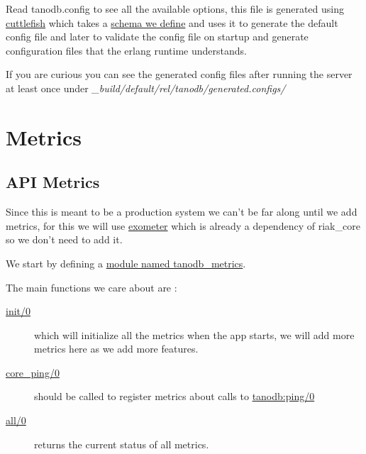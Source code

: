 \documentclass[letterpaper,10pt,english]{sphinxmanual}
\begin{document}
Read tanodb.config to see all the available options, this file is generated
using \href{https://github.com/basho/cuttlefish}{cuttlefish} which takes a
\href{https://github.com/marianoguerra/tanodb/blob/220bcade820538aec05993065ac4edf19f3ebcde/config/config.schema}{schema we define} and uses it to generate
the default config file and later to validate the config file on startup
and generate configuration files that the erlang runtime understands.

If you are curious you can see the generated config files after running the
server at least once under \emph{\_build/default/rel/tanodb/generated.configs/}


\chapter{Metrics}
\label{metrics:metrics}\label{metrics::doc}

\section{API Metrics}
\label{metrics:api-metrics}
Since this is meant to be a production system we can't be far along until we
add metrics, for this we will use \href{https://github.com/Feuerlabs/exometer}{exometer} which is already a dependency of riak\_core so we don't need to add it.

We start by defining a \href{https://github.com/marianoguerra/tanodb/blob/0ea3595aefce0f9098cb651eb33263933ce9d6e7/apps/tanodb/src/tanodb\_metrics.erl}{module named tanodb\_metrics}.

The main functions we care about are :
\begin{description}
\item[{\href{https://github.com/marianoguerra/tanodb/blob/0ea3595aefce0f9098cb651eb33263933ce9d6e7/apps/tanodb/src/tanodb\_metrics.erl\#L16}{init/0}}] \leavevmode
which will initialize all the metrics when the app starts, we will add more metrics here as we add more features.

\item[{\href{https://github.com/marianoguerra/tanodb/blob/0ea3595aefce0f9098cb651eb33263933ce9d6e7/apps/tanodb/src/tanodb\_metrics.erl\#L14}{core\_ping/0}}] \leavevmode
should be called to register metrics about calls to \href{https://github.com/marianoguerra/tanodb/blob/0ea3595aefce0f9098cb651eb33263933ce9d6e7/apps/tanodb/src/tanodb.erl\#L15}{tanodb:ping/0}

\item[{\href{https://github.com/marianoguerra/tanodb/commit/0ea3595aefce0f9098cb651eb33263933ce9d6e7\#diff-afa3f67ec87f742d64ee9ed311455777R8}{all/0}}] \leavevmode
returns the current status of all metrics.

\end{description}
\end{document}
